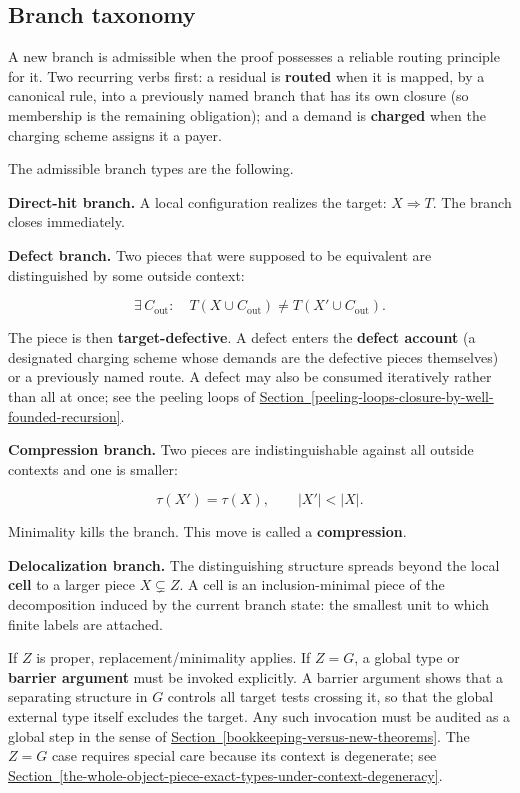 \documentclass[
  11pt,
]{article}
\theoremstyle{definition}
\newcommand{\secref}[1]{\hyperref[#1]{Section~\ref*{#1}}}
\begin{document}
\subsection{Branch taxonomy}\label{the-branch-taxonomy}

A new branch is admissible when the proof possesses a reliable routing
principle for it. Two recurring verbs first: a residual is
\textbf{routed} when it is mapped, by a canonical rule, into a
previously named branch that has its own closure (so membership is the
remaining obligation); and a demand is \textbf{charged} when the
charging scheme assigns it a payer.

The admissible branch types are the following.

\textbf{Direct-hit branch.} A local configuration realizes the target:
\(X \Rightarrow T\). The branch closes immediately.

\textbf{Defect branch.} Two pieces that were supposed to be equivalent
are distinguished by some outside context:

\[
\exists\, C_{\mathrm{out}}:\quad T(X\cup C_{\mathrm{out}}) \ne T(X'\cup C_{\mathrm{out}}).
\]

The piece is then \textbf{target-defective}. A defect enters the
\textbf{defect account} (a designated charging scheme whose demands are
the defective pieces themselves) or a previously named route. A defect
may also be consumed iteratively rather than all at once; see the
peeling loops of \secref{peeling-loops-closure-by-well-founded-recursion}.

\textbf{Compression branch.} Two pieces are indistinguishable against
all outside contexts and one is smaller:

\[
\tau(X') = \tau(X), \qquad |X'| < |X|.
\]

Minimality kills the branch. This move is called a \textbf{compression}.

\textbf{Delocalization branch.} The distinguishing structure spreads
beyond the local \textbf{cell} to a larger piece \(X \subsetneq Z\). A
cell is an inclusion-minimal piece of the decomposition induced by the
current branch state: the smallest unit to which finite labels are
attached.

If \(Z\) is proper, replacement/minimality applies. If \(Z = G\), a
global type or \textbf{barrier argument} must be invoked explicitly. A
barrier argument shows that a separating structure in \(G\) controls all
target tests crossing it, so that the global external type itself
excludes the target. Any such invocation must be audited as a global
step in the sense of \secref{bookkeeping-versus-new-theorems}. The \(Z=G\) case requires special care
because its context is degenerate; see \secref{the-whole-object-piece-exact-types-under-context-degeneracy}.
\end{document}
